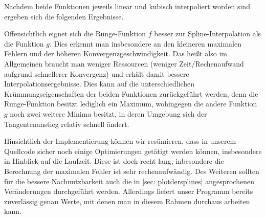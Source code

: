\documentclass[a4paper, 11pt, ngerman]{scrartcl}
\begin{document}
Nachdem beide Funktionen jeweils linear und kubisch interpoliert worden sind ergeben sich die folgenden Ergebnisse.

Offensichtlich eignet sich die Runge-Funktion $f$ besser zur Spline-Interpolation als die Funktion $g$. Dies erkennt man insbesondere an den kleineren maximalen Fehlern und der höheren Konvergenzgeschwindigkeit. Das heißt also im Allgemeinen braucht man weniger Ressourcen (weniger Zeit/Rechenaufwand aufgrund schnellerer Konvergenz) und erhält damit bessere Interpolationsergebnisse. Dies kann auf die unterschiedlichen Krümmungseigenschaften der beiden Funktionen zurückgeführt werden, denn die Runge-Funktion besitzt lediglich ein Maximum, wohingegen die andere Funktion $g$ noch zwei weitere Minima besitzt, in deren Umgebung sich der Tangentenanstieg relativ schnell ändert. 

Hinsichtlich der Implementierung können wir resümieren, dass in unserem Quellcode sicher noch einige Optimierungen getätigt werden können, insbesondere in Hinblick auf die Laufzeit. Diese ist doch recht lang, inbesondere die Berechnung der maximalen Fehler ist sehr rechenaufwändig. Des Weiteren sollten für die bessere Nachnutzbarkeit auch die in \cref{sec: plotdersplines} angesprochenen Veränderungen durchgeführt werden.
Allerdings liefert unser Programm bereits zuverlässig genau Werte, mit denen man in diesem Rahmen durchaus arbeiten kann.
\end{document}
